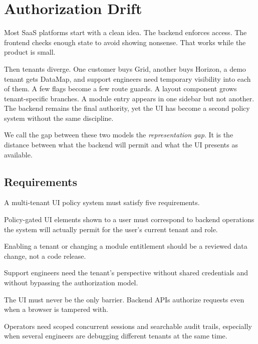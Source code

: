 \section{Authorization Drift}
\label{sec:problem}

Most SaaS platforms start with a clean idea. The backend enforces access. The frontend checks enough state to avoid showing nonsense. That works while the product is small.

Then tenants diverge. One customer buys Grid, another buys Horizon, a demo tenant gets DataMap, and support engineers need temporary visibility into each of them. A few flags become a few route guards. A layout component grows tenant-specific branches. A module entry appears in one sidebar but not another. The backend remains the final authority, yet the UI has become a second policy system without the same discipline.

We call the gap between these two models the \emph{representation gap}. It is the distance between what the backend will permit and what the UI presents as available.

\subsection{Requirements}
\label{sec:requirements}

A multi-tenant UI policy system must satisfy five requirements.

\begin{description}[leftmargin=2.2em, style=nextline]
  \item[R1. No stale gates.] Policy-gated UI elements shown to a user must correspond to backend operations the system will actually permit for the user's current tenant and role.
  \item[R2. Configuration over redeploy.] Enabling a tenant or changing a module entitlement should be a reviewed data change, not a code release.
  \item[R3. Safe impersonation.] Support engineers need the tenant's perspective without shared credentials and without bypassing the authorization model.
  \item[R4. Defense in depth.] The UI must never be the only barrier. Backend APIs authorize requests even when a browser is tampered with.
  \item[R5. Support at scale.] Operators need scoped concurrent sessions and searchable audit trails, especially when several engineers are debugging different tenants at the same time.
\end{description}

